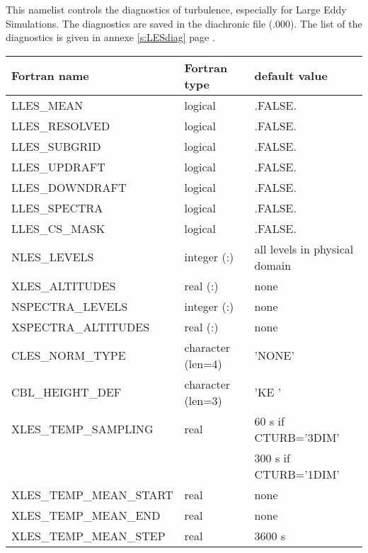 This namelist controls the diagnostics of turbulence, especially
for Large Eddy Simulations. The diagnostics are saved in the
diachronic file (.000). The list of the diagnostics is given in annexe \ref{s:LESdiag} page  \pageref{s:LESdiag}.

\begin{center}
\begin{tabular} {|l|l|l|}
\hline
Fortran name & Fortran type & default value \\
\hline
LLES\_MEAN                    &  logical          & .FALSE.  \\
LLES\_RESOLVED                &  logical          & .FALSE.  \\
LLES\_SUBGRID                 &  logical          & .FALSE.  \\
LLES\_UPDRAFT                 &  logical          & .FALSE.  \\
LLES\_DOWNDRAFT               &  logical          & .FALSE.  \\
LLES\_SPECTRA                 &  logical          & .FALSE.  \\
LLES\_CS\_MASK                &  logical          & .FALSE.  \\
NLES\_LEVELS                  & integer (:)       & all levels in physical domain\\
XLES\_ALTITUDES               & real (:)          & none \\
NSPECTRA\_LEVELS              & integer (:)   & none \\
XSPECTRA\_ALTITUDES           & real (:)   & none \\
CLES\_NORM\_TYPE              & character (len=4) & 'NONE' \\
CBL\_HEIGHT\_DEF              & character (len=3) & 'KE ' \\
XLES\_TEMP\_SAMPLING          & real              & 60 s if CTURB='3DIM' \\
                              &                   & 300 s if CTURB='1DIM' \\
XLES\_TEMP\_MEAN\_START       & real              & none \\
XLES\_TEMP\_MEAN\_END         & real              & none \\
XLES\_TEMP\_MEAN\_STEP        & real              & 3600 s \\

\end{tabular}
\end{center}
